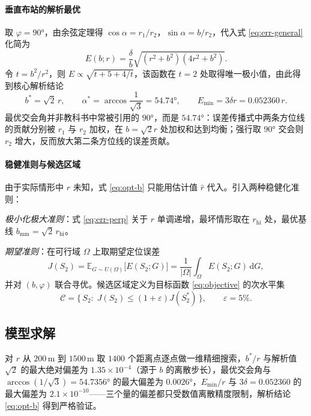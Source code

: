 \documentclass[12pt,a4paper]{ctexart}
\begin{document}
\paragraph{垂直布站的解析最优}
取 $\varphi=90°$，由余弦定理得 $\cos\alpha=r_1/r_2$，$\sin\alpha=b/r_2$，代入式 \eqref{eq:err-general} 化简为
\begin{equation}
  E(b;r)=\frac{\delta}{b}\sqrt{(r^2+b^2)(4r^2+b^2)}.
  \label{eq:err-perp}
\end{equation}
令 $t=b^2/r^2$，则 $E\propto\sqrt{t+5+4/t}$，该函数在 $t=2$ 处取得唯一极小值，由此得到核心解析结论
\begin{equation}
  \boxed{b^{*}=\sqrt{2}\,r,\qquad\alpha^{*}=\arccos\frac{1}{\sqrt{3}}=54.74°,\qquad E_{\min}=3\delta r=0.052360\,r.}
  \label{eq:opt-b}
\end{equation}
最优交会角并非教科书中常被引用的 $90°$，而是 $54.74°$：误差传播式中两条方位线的贡献分别被 $r_1$ 与 $r_2$ 加权，在 $b=\sqrt{2}r$ 处加权和达到均衡；强行取 $90°$ 交会则 $r_2$ 增大，反而放大第二条方位线的误差贡献。

\paragraph{稳健准则与候选区域}
由于实际情形中 $r$ 未知，式 \eqref{eq:opt-b} 只能用估计值 $\hat{r}$ 代入。引入两种稳健化准则：

\textit{极小化极大准则}：式 \eqref{eq:err-perp} 关于 $r$ 单调递增，最坏情形取在 $r_{\mathrm{hi}}$ 处，最优基线 $b_{\mathrm{mm}}=\sqrt{2}\,r_{\mathrm{hi}}$。

\textit{期望准则}：在可行域 $\Omega$ 上取期望定位误差
\begin{equation}
  J(S_2)=\mathbb{E}_{G\sim U(\Omega)}\bigl[E(S_2;G)\bigr]=\frac{1}{|\Omega|}\int_{\Omega}E(S_2;G)\,\mathrm{d}G,
  \label{eq:objective}
\end{equation}
并对 $(b,\varphi)$ 联合寻优。候选区域定义为目标函数 \eqref{eq:objective} 的次水平集
\begin{equation}
  \mathcal{C}=\bigl\{\,S_2:\;J(S_2)\le(1+\varepsilon)J(S_2^{*})\,\bigr\},\qquad\varepsilon=5\%.
  \label{eq:candidate}
\end{equation}

\subsection{模型求解}

对 $r$ 从 $200\,\text{m}$ 到 $1500\,\text{m}$ 取 $1400$ 个距离点逐点做一维精细搜索，$b^{*}/r$ 与解析值 $\sqrt{2}$ 的最大绝对偏差为 $1.35\times10^{-4}$（源于 $b$ 的离散步长），最优交会角与 $\arccos(1/\sqrt{3})=54.7356°$ 的最大偏差为 $0.0026°$，$E_{\min}/r$ 与 $3\delta=0.052360$ 的最大偏差为 $2.1\times10^{-10}$——三个量的偏差都只受数值离散精度限制，解析结论 \eqref{eq:opt-b} 得到严格验证。
\end{document}
